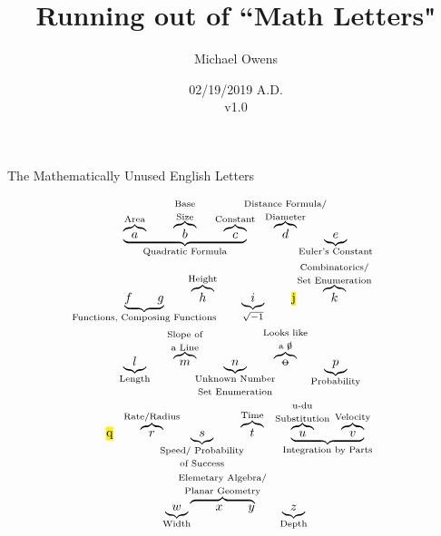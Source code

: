 \documentclass[12pt]{article}
\title{Running out of ``Math Letters"}
\author{Michael Owens}
\date{02/19/2019 A.D.\\v1.0}
\newcommand\slashzero{\stackinset{c}{}{c}{}{/}{0}}
\newcommand{\modo}[2]{\overbrace{ #1 }^{\makebox[0pt]{\text{{\scriptsize #2}}}}}
\newcommand{\modu}[2]{\underbrace{ #1 }_{\makebox[0pt]{\text{{\scriptsize #2}}}}}
\newcommand{\dmodo}[3]{\modo{#1}{$\genfrac{}{}{0pt}{0}{\text{#2}}{\text{#3}}$}}
\newcommand{\dmodu}[3]{\modu{#1}{$\genfrac{}{}{0pt}{0}{\text{#2}}{\text{#3}}$}}
\newcommand{\qs}{\qquad}
\begin{document}
\maketitle
{}
\begin{center}
\begin{mybox}
\center The Mathematically Unused English Letters
\end{mybox}
\begin{gather*}
\modu{\modo{a}{Area} \qs \dmodo{b}{Base}{Size} \qs \modo{c}{Constant}}{Quadratic Formula} \qs \dmodo{d}{Distance Formula/}{Diameter} \qs \modu{e}{Euler's Constant}\\
\modu{f \qs g}{Functions,\ Composing\ Functions} \qs \modo{h}{Height} \qs \modu{i}{$\sqrt{-1}$} \qs \text{\hl{j}} \qs \dmodo{k}{Combinatorics/}{Set Enumeration}\\
\modu{l}{Length} \qs \dmodo{m}{Slope of}{a Line}  \qs \dmodu{n}{Unknown Number}{Set Enumeration} \qs \dmodo{\text{\st{o}}}{Looks like}{a \slashzero} \qs \modu{p}{Probability}\\
\text{\hl{q}} \qs \modo{r}{Rate/Radius} \qs \dmodu{s}{Speed/ Probability}{of Success} \qs \modo{t}{Time} \qs \modu{\dmodo{u}{u-du}{Substitution} \qs \modo{v}{Velocity}}{Integration by Parts}\\
\modu{w}{Width} \dmodo{\qs x \qs y}{Elemetary Algebra/}{Planar Geometry} \qs \modu{z}{Depth}\\
\end{gather*}

\end{center}
\end{document}
